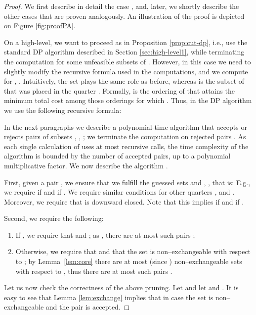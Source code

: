 \documentclass{article}
\theoremstyle{definition}
\begin{document}
\begin{proof}
We first describe in detail the case , and, later, we shortly describe the other cases that are proven analogously.
An illustration of the proof is depicted on Figure \ref{fig:proofPA}.

On a high-level, we want to proceed as in Proposition \ref{prop:cut-dp}, i.e., use the standard DP algorithm described in Section \ref{sec:high-level1},
while terminating the computation for some unfeasible subsets of .
However, in this case we need to slightly modify the recursive formula used in the computations, and we compute  for , .
Intuitively, the set  plays the same role as before, whereas  is the subset of  that was placed in the quarter . Formally,  is the ordering of  that attains the minimum total cost among those orderings  for which .
Thus, in the DP algorithm we use the following recursive formula:

In the next paragraphs we describe a polynomial-time algorithm  that accepts or rejects pairs of subsets , , ;
we terminate the computation on rejected pairs .
As each single calculation of  uses at most  recursive calls, the time complexity of the algorithm is bounded by the number of accepted pairs, up to a polynomial multiplicative factor.
We now describe the algorithm .

First, given a pair , we ensure that we fulfill the guessed sets  and , , that is:
E.g., we require  if 
and  if . We require similar conditions for other quarters ,  and . Moreover, we require that  is downward closed. Note that this implies  if  and  if .

Second, we require the following:
\begin{enumerate}
\item If , we require that  and ; as , there are at most  such pairs ;
\item Otherwise, we require that  and that the set  is non--exchangeable with respect to ;
by Lemma~\ref{lem:core} there are at most 
 (since ) non--exchangeable sets with respect to ,
thus there are at most  such pairs .
\end{enumerate}

Let us now check the correctness of the above pruning. Let  and let  and .
It is easy to see that Lemma \ref{lem:exchange} implies that in case  the set  is non--exchangeable and
the pair  is accepted.


\end{proof}
\end{document}
